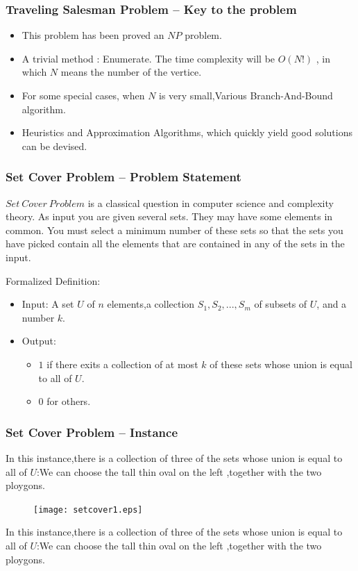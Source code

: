 \documentclass[slidestop,compress,mathserif]{beamer}
\begin{document}
\frame
{
\frametitle{Traveling Salesman Problem -- Key to the problem}
\begin{itemize}
 \item This problem has been proved an $NP$ problem.
 \item A trivial method : Enumerate. The time complexity will be $O(N!)$ , in which $N$ means the number of the vertice.
 \item For some special cases, when $N$ is very small,Various Branch-And-Bound algorithm.
 \item Heuristics and Approximation Algorithms, which quickly yield good solutions can be devised.
\end{itemize}

}
\frame
{
\frametitle{Set Cover Problem -- Problem Statement}
$Set \ Cover  \ Problem$ is a classical question in computer science and complexity theory. As input you are given several sets. They may have some elements in common. You must select a minimum number of these sets so that the sets you have picked contain all the elements that are contained in any of the sets in the input.
\begin{block}{Formalized Definition:} 
\begin{itemize}
 \item Input: 
A set $U$ of $n$ elements,a collection $S_1, S_2,...,S_m$ of subsets of $U$, and a number $k$.

 \item Output: 
\begin{itemize}
  \item $1$ if there exits a collection of at most $k$ of these sets whose union is equal to all of $U$.
  \item $0$ for others.
\end{itemize}

\end{itemize}
\end{block}
}


\frame
{
\frametitle{Set Cover Problem -- Instance}
In this instance,there is a collection of three of the sets whose union is equal to all of $U$:We can choose the tall thin oval on the left ,together with the two ploygons.
\begin{figure}
 \texttt{[image: setcover1.eps]}
\end{figure}
In this instance,there is a collection of three of the sets whose union is equal to all of $U$:We can choose the tall thin oval on the left ,together with the two ploygons.
  


}
\end{document}
